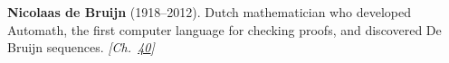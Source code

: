 \textbf{Nicolaas de Bruijn} (1918–2012). Dutch mathematician who developed Automath, the first computer language for checking proofs, and discovered De Bruijn sequences. \emph{[Ch.~\hyperref[ch:dnasequencing]{40}]}

